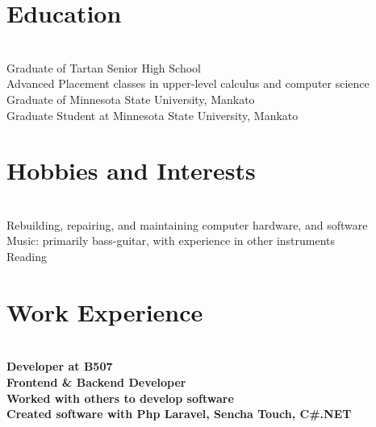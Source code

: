 \documentclass{res}
\begin{document}
    
    \address{
        1330 Monks Ave, Apt. 210A, Mankato MN, 56001
        \\651-434-0426
        \\chasb96@gmail.com
    }
    
    \begin{resume}
        \section{Education}
        \vspace{-0.2in}
        \begin{tabbing}
            \\ Graduate of Tartan Senior High School
            \\ Advanced Placement classes in upper-level calculus and computer science
            \\ Graduate of Minnesota State University, Mankato
            \\ Graduate Student at Minnesota State University, Mankato
        \end{tabbing}

        \section{Hobbies and Interests}
        \vspace{-0.2in}
        \begin{tabbing}
            \\ Rebuilding, repairing, and maintaining computer hardware, and software
            \\ Music: primarily bass-guitar, with experience in other instruments
            \\ Reading
        \end{tabbing}

        \section{Work Experience}
        \vspace{-0.2in}
        \begin{tabbing}
            \\ \bf Developer at B507
            \\ Frontend & Backend Developer
            \\ Worked with others to develop software
            \\ Created software with Php Laravel, Sencha Touch, C#.NET
        \end{tabbing}


\end{resume}
\end{document}
